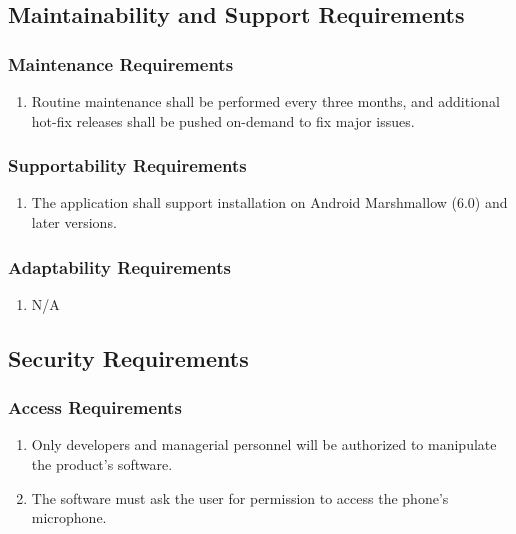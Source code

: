 \documentclass[]{article}
\begin{document}

\subsection{Maintainability and Support Requirements}
\label{sub:maintainability_and_support_requirements}

\subsubsection{Maintenance Requirements}
\label{ssub:maintenance_requirements}
\begin{enumerate}[{MS}1. ]
	\item  Routine maintenance shall be performed every three months, and additional hot-fix releases shall be pushed on-demand to fix major issues.

\end{enumerate}

\subsubsection{Supportability Requirements}
\label{ssub:supportability_requirements}
\begin{enumerate}[{MS}1. ]
	\item The application shall support installation on Android Marshmallow (6.0) and later versions.
\end{enumerate}

\subsubsection{Adaptability Requirements}
\label{ssub:adaptability_requirements}
\begin{enumerate}[{MS}1. ]
	\item N/A
\end{enumerate}


\subsection{Security Requirements}
\label{sub:security_requirements}

\subsubsection{Access Requirements}
\label{ssub:access_requirements}
\begin{enumerate}[{SR}1. ]
	\item Only developers and managerial personnel will be authorized to manipulate the product’s software.
	\item  The software must ask the user for permission to access the phone’s microphone.

\end{enumerate}
\end{document}
